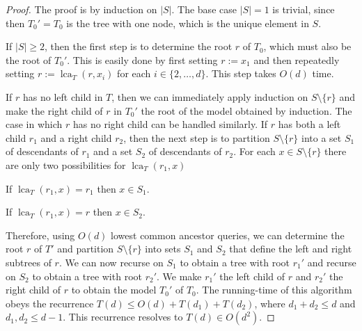 \documentclass{patmorin}
\DeclareMathOperator{\lca}{lca}
\begin{document}
\begin{proof}
  The proof is by induction on $|S|$.  The base case $|S|=1$ is trivial, since then $T_0'=T_0$ is the tree with one node, which is the unique element in $S$.

  If $|S|\ge 2$, then the first step is to determine the root $r$ of $T_0$, which must also be the root of $T_0'$.  This is easily done by first setting $r:=x_1$ and then repeatedly setting $r:=\lca_{T}(r,x_i)$ for each $i\in\{2,\ldots,d\}$. This step takes $O(d)$ time.

  If $r$ has no left child in $T$, then we can immediately apply induction on $S\setminus\{r\}$ and make the right child of $r$ in $T_0'$ the root of the model obtained by induction.  The case in which $r$ has no right child can be handled similarly. If $r$ has both a left child $r_1$ and a right child $r_2$, then the next step is to partition $S\setminus\{r\}$ into a set $S_1$ of descendants of $r_1$ and a set $S_2$ of descendants of $r_2$.   For each $x\in S\setminus\{r\}$ there are only two possibilities for $\lca_{T}(r_1,x)$
  \begin{compactenum}
    \item If $\lca_{T}(r_1,x)=r_1$ then $x\in S_1$.
    \item If $\lca_{T}(r_1,x)=r$ then $x\in S_2$.
  \end{compactenum}
  Therefore, using $O(d)$ lowest common ancestor queries, we can determine the root $r$ of $T'$ and partition $S\setminus\{r\}$ into sets $S_1$ and $S_2$ that define the left and right subtrees of $r$.  We can now recurse on $S_1$ to obtain a tree with root $r_1'$ and recurse on $S_2$ to obtain a tree with root $r_2'$.  We make $r_1'$ the left child of $r$ and $r_2'$ the right child of $r$ to obtain the model $T_0'$ of $T_0$.  The running-time of this  algorithm obeys the recurrence $T(d)\le O(d)+T(d_1) + T(d_2)$, where $d_1 + d_2 \leq d$ and $d_1, d_2 \leq d-1$.  This recurrence resolves to $T(d)\in O(d^2)$.
\end{proof}

\end{document}
